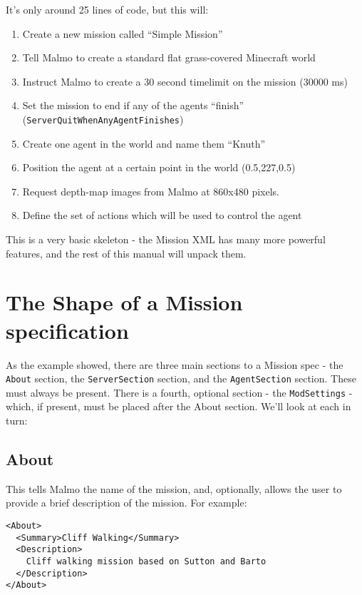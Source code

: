 \documentclass[11pt]{article} %
\begin{document}
It's only around 25 lines of code, but this will:
\begin{enumerate}
  \item Create a new mission called ``Simple Mission''
  \item Tell Malmo to create a standard flat grass-covered Minecraft world
  \item Instruct Malmo to create a 30 second timelimit on the mission (30000 ms)
  \item Set the mission to end if any of the agents ``finish'' (\lstinline!ServerQuitWhenAnyAgentFinishes!)
  \item Create one agent in the world and name them ``Knuth''
  \item Position the agent at a certain point in the world (0.5,227,0.5)
  \item Request depth-map images from Malmo at 860x480 pixels.
  \item Define the set of actions which will be used to control the agent
\end{enumerate}

This is a very basic skeleton - the Mission XML has many more powerful features, and the rest of this manual will unpack them.

\section{The Shape of a Mission specification}
As the example showed, there are three main sections to a Mission spec - the \lstinline!About! section, the \lstinline!ServerSection! section, and the \lstinline!AgentSection! section. These must always be present. There is a fourth, optional section - the \lstinline!ModSettings! - which, if present, must be placed after the About section.
We'll look at each in turn:

\subsection{About}

This tells Malmo the name of the mission, and, optionally, allows the user to provide a brief description of the mission. For example:

\begin{lstlisting}[frame=lines]
<About>
  <Summary>Cliff Walking</Summary>
  <Description>
    Cliff walking mission based on Sutton and Barto
  </Description>
</About>
\end{lstlisting}
\end{document}
